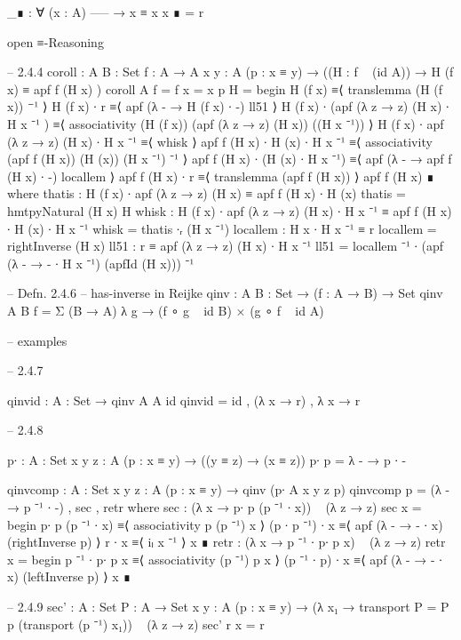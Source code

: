 \documentclass[11pt, a4paper]{article}
\begin{document}
\begin{code}
    _∎ : ∀ (x : A)
      -----
      → x ≡ x
    x ∎  = r 

  open ≡-Reasoning

  -- 2.4.4
  coroll :  {A B : Set} {f : A → A} {x y : A} (p : x ≡ y) → ((H : f ~ (id {A})) → H (f x) ≡ apf f (H x) )
  coroll {A} {f = f} {x = x} p H =
    begin
      H (f x)
    ≡⟨ translemma (H (f x)) ⁻¹ ⟩
      H (f x) ∙ r
    ≡⟨ apf (λ - → H (f x) ∙ -) ll51 ⟩
      H (f x) ∙ (apf (λ z → z) (H x) ∙ H x ⁻¹ )
    ≡⟨ associativity (H (f x)) (apf (λ z → z) (H x)) ((H x ⁻¹)) ⟩
      H (f x) ∙ apf (λ z → z) (H x) ∙ H x ⁻¹ 
    ≡⟨ whisk ⟩
      apf f (H x) ∙ H (x) ∙ H x ⁻¹
    ≡⟨ associativity (apf f (H x)) (H (x)) (H x ⁻¹) ⁻¹ ⟩
      apf f (H x) ∙ (H (x) ∙ H x ⁻¹)
    ≡⟨ apf (λ - → apf f (H x) ∙ -) locallem ⟩
      apf f (H x) ∙ r
    ≡⟨ translemma (apf f (H x)) ⟩
      apf f (H x) ∎
    where 
      thatis : H (f x) ∙ apf (λ z → z) (H x) ≡ apf f (H x) ∙ H (x)
      thatis = hmtpyNatural (H x) H
      whisk : H (f x) ∙ apf (λ z → z) (H x) ∙ H x ⁻¹ ≡ apf f (H x) ∙ H (x) ∙ H x ⁻¹
      whisk = thatis ∙ᵣ (H x ⁻¹)
      locallem :  H x ∙ H x ⁻¹ ≡ r
      locallem = rightInverse (H x)
      ll51 : r ≡ apf (λ z → z) (H x) ∙ H x ⁻¹
      ll51 = locallem ⁻¹ ∙ (apf (λ - → - ∙ H x ⁻¹) (apfId (H x))) ⁻¹

  -- Defn. 2.4.6
  -- has-inverse in Reijke
  qinv : {A B : Set} → (f : A → B) → Set 
  qinv {A} {B} f = Σ (B → A) λ g → (f ∘ g ~ id {B}) ×  (g ∘ f ~ id {A})

  -- examples

  -- 2.4.7

  qinvid : {A : Set} → qinv {A} {A} id
  qinvid = id , (λ x → r) , λ x → r

  -- 2.4.8

  p∙ : {A : Set} {x y z : A} (p : x ≡ y) → ((y ≡ z) → (x ≡ z)) 
  p∙ p = λ - → p ∙ -

  qinvcomp : {A : Set} {x y z : A} (p : x ≡ y) → qinv (p∙ {A} {x} {y} {z} p)
  qinvcomp p = (λ - → p ⁻¹ ∙ -) , sec , retr
    where
      sec : (λ x → p∙ p (p ⁻¹ ∙ x)) ~ (λ z → z)
      sec x = 
        begin
          p∙ p (p ⁻¹ ∙ x)
        ≡⟨ associativity p (p ⁻¹) x ⟩
          (p ∙ p ⁻¹) ∙ x
        ≡⟨ apf (λ - → - ∙ x) (rightInverse p) ⟩
          r ∙ x
        ≡⟨ iₗ x ⁻¹ ⟩
          x ∎
      retr : (λ x → p ⁻¹ ∙ p∙ p x) ~ (λ z → z)
      retr x = 
        begin
          p ⁻¹ ∙ p∙ p x
        ≡⟨ associativity (p ⁻¹) p x ⟩
          (p ⁻¹ ∙ p) ∙ x
        ≡⟨ apf (λ - → - ∙ x) (leftInverse p) ⟩
          x ∎


  -- 2.4.9
  sec' : {A : Set} {P : A → Set} {x y : A} (p : x ≡ y) → (λ x₁ → transport {P = P} p (transport (p ⁻¹) x₁)) ~ (λ z → z)
  sec' r x = r


\end{code}
\end{document}
